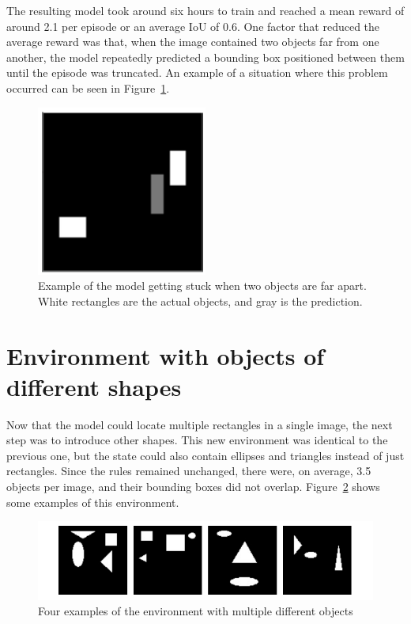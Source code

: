 \documentclass[
  digital,     %
  oneside,     %
  nosansbold,  %
  nocolorbold, %
  lof,         %
  lot,         %
]{fithesis4}
\begin{document}
The resulting model took around six hours to train and reached a mean reward of around 2.1 per episode or an average IoU of 0.6. One factor that reduced the average reward was that, when the image contained two objects far from one another, the model repeatedly predicted a bounding box positioned between them until the episode was truncated. An example of a situation where this problem occurred can be seen in Figure~\ref{fig:v3_stuck}.

\begin{figure}
    \centering
    \includegraphics[width=0.25\linewidth]{results/v3_stuck.png}
    \caption{Example of the model getting stuck when two objects are far apart. White rectangles are the actual objects, and gray is the prediction.}
    \label{fig:v3_stuck}
\end{figure}

\section{Environment with objects of different shapes}
\label{sec:different_shapes}
Now that the model could locate multiple rectangles in a single image, the next step was to introduce other shapes. This new environment was identical to the previous one, but the state could also contain ellipses and triangles instead of just rectangles. Since the rules remained unchanged, there were, on average, 3.5 objects per image, and their bounding boxes did not overlap. Figure~\ref{fig:env4} shows some examples of this environment.

\begin{figure}
    \includegraphics[width=1\linewidth]{env_examples/env4.pdf}
    \caption{Four examples of the environment with multiple different objects}
    \label{fig:env4}
\end{figure}
 
\end{document}
